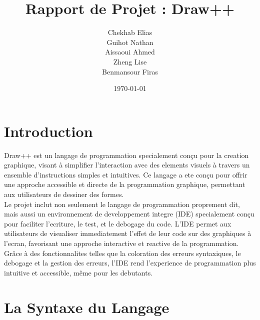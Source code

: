 \documentclass[12pt,a4paper]{report}
\title{Rapport de Projet : Draw++}
\author{
    Chekhab Elias \\
    Guihot Nathan \\
    Aissaoui Ahmed \\
    Zheng Lise \\
    Benmansour Firas
}
\date{\today}
\begin{document}
\maketitle
\tableofcontents

\chapter{Introduction}
Draw++ est un langage de programmation specialement conçu pour la creation graphique, visant à simplifier l'interaction avec des elements visuels à travers un ensemble d'instructions simples et intuitives. Ce langage a ete conçu pour offrir une approche accessible et directe de la programmation graphique, permettant aux utilisateurs de dessiner des formes.\\

Le projet inclut non seulement le langage de programmation proprement dit, mais aussi un environnement de developpement integre (IDE) specialement conçu pour faciliter l'ecriture, le test, et le debogage du code. L'IDE permet aux utilisateurs de visualiser immediatement l'effet de leur code sur des graphiques à l'ecran, favorisant une approche interactive et reactive de la programmation. Grâce à des fonctionnalites telles que la coloration des erreurs syntaxiques, le debogage et la gestion des erreurs, l'IDE rend l'experience de programmation plus intuitive et accessible, même pour les debutants.

\chapter{La Syntaxe du Langage}
\end{document}
